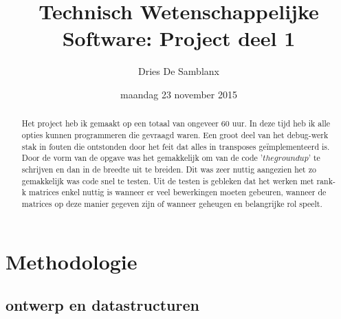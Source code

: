 \documentclass[a4paper]{article}
\title{Technisch Wetenschappelijke Software: Project deel 1}
\author{Dries De Samblanx}
\date{maandag 23 november 2015}
\begin{document}
\maketitle

\begin{abstract}

Het project heb ik gemaakt op een totaal van ongeveer 60 uur. In deze tijd heb ik alle opties kunnen programmeren die gevraagd waren. Een groot deel van het debug-werk stak in fouten die ontstonden door het feit dat alles in transposes ge\"implementeerd is. Door de vorm van de opgave was het gemakkelijk om van de code '\(the ground up\)' te schrijven en dan in de breedte uit te breiden. Dit was zeer nuttig aangezien het zo gemakkelijk was code snel te testen. Uit de testen is gebleken dat het werken met rank-k matrices enkel nuttig is wanneer er veel bewerkingen moeten gebeuren, wanneer de matrices op deze manier gegeven zijn of wanneer geheugen en belangrijke rol speelt. 

\end{abstract}

\section*{Methodologie}

\subsection*{ontwerp en datastructuren}
\end{document}
